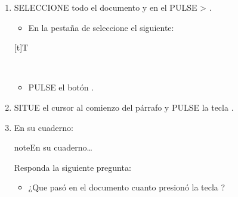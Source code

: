 \documentclass[letterpaper,10pt,spanish]{sphinxmanual}
\let\sphinxpxdimen\pdfpxdimen\else\newdimen\sphinxpxdimen
\begin{document}
\begin{enumerate}
\begin{itemize}
\begin{itemize}
\begin{itemize}
\end{itemize}

\end{itemize}

\item {} 
\sphinxAtStartPar
PULSE el botón .

\end{itemize}

\item {} 
\sphinxAtStartPar
SELECCIONE todo el documento y en el  PULSE  > .
\begin{itemize}
\item {} 
\sphinxAtStartPar
En la pestaña de  seleccione el siguiente:

\end{itemize}


\begin{savenotes}\sphinxattablestart
\sphinxthistablewithglobalstyle
\centering
\begin{tabulary}{\linewidth}[t]{T}
\sphinxtoprule
\sphinxtableatstartofbodyhook

\begin{sphinxfigure-in-table}
\centering

\noindent\sphinxincludegraphics[width=180\sphinxpxdimen]{{image162}.png}
\end{sphinxfigure-in-table}\relax
\\
\sphinxbottomrule
\end{tabulary}
\sphinxtableafterendhook\par
\sphinxattableend\end{savenotes}
\begin{itemize}
\item {} 
\sphinxAtStartPar
PULSE el botón .

\end{itemize}

\item {} 
\sphinxAtStartPar
SITUE el cursor al comienzo del párrafo  y PULSE la tecla .

\item {} 
\sphinxAtStartPar
En su cuaderno:

\begin{sphinxadmonition}{note}{En su cuaderno…}

\sphinxAtStartPar
Responda la siguiente pregunta:
\begin{itemize}
\item {} 
\sphinxAtStartPar
¿Que pasó en el documento cuanto presionó la tecla ?


\end{itemize}
\end{sphinxadmonition}
\end{enumerate}
\end{document}
